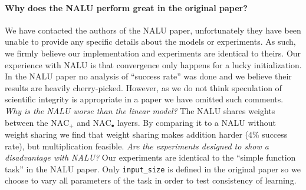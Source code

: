\documentclass{article}
\begin{document}

\paragraph{Why does the NALU perform great in the original paper?} %
We have contacted the authors of the NALU paper, unfortunately they have been unable to provide any specific details about the models or experiments.
As such, we firmly believe our implementation and experiments are identical to theirs.
Our experience with NALU is that convergence only happens for a lucky initialization.
In the NALU paper no analysis of ``success rate'' was done and we believe their results are heavily cherry-picked.
However, as we do not think speculation of scientific integrity is appropriate in a paper we have omitted such comments. %
\textit{Why is the NALU worse than the linear model?} The NALU shares weights between the $\mathrm{NAC}_{+}$ and $\mathrm{NAC}_{\bullet}$ layers.
By comparing it to a NALU without weight sharing we find that weight sharing makes addition harder (4\% success rate), but multiplication feasible. %
\textit{Are the experiments designed to show a disadvantage with NALU?} Our experiments are identical to the ``simple function task'' in the NALU paper.
Only \texttt{input\_size} is defined in the original paper so we choose to vary all parameters of the task in order to test consistency of learning.
\end{document}
